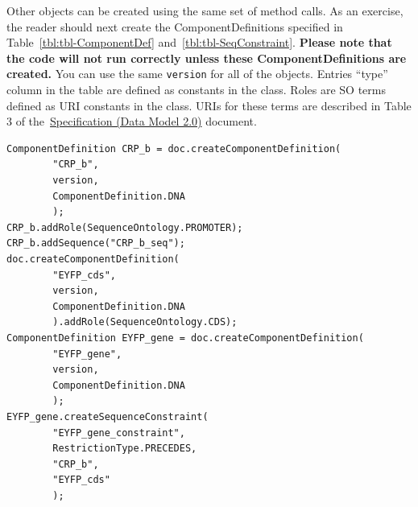 Other  objects can be created using the same set of method calls. As an exercise, the reader should next create the ComponentDefinitions specified in Table~\ref{tbl:tbl-ComponentDef} and~\ref{tbl:tbl-SeqConstraint}. \textbf{Please note that the code will not run correctly unless these ComponentDefinitions are created.} You can use the same \lstinline+version+ for all of the  objects. Entries ``type'' column in the table are defined as constants in the  class. Roles are SO terms defined as URI constants in the  class. URIs for these terms are described in Table 3 of the~\href{http://sbolstandard.org/downloads/specification-data-model-2-0/}{Specification  (Data Model 2.0)} document.

\vspace{\abovedisplayskip}
\begin{minipage}{0.95\textwidth}
\begin{lstlisting}
ComponentDefinition CRP_b = doc.createComponentDefinition(
        "CRP_b",
        version, 
        ComponentDefinition.DNA
        );
CRP_b.addRole(SequenceOntology.PROMOTER);
CRP_b.addSequence("CRP_b_seq");
doc.createComponentDefinition(
        "EYFP_cds", 
        version, 
        ComponentDefinition.DNA
        ).addRole(SequenceOntology.CDS);
ComponentDefinition EYFP_gene = doc.createComponentDefinition(
        "EYFP_gene", 
        version, 
        ComponentDefinition.DNA
        );
EYFP_gene.createSequenceConstraint(
        "EYFP_gene_constraint", 
        RestrictionType.PRECEDES, 
        "CRP_b", 
        "EYFP_cds"
        );
\end{lstlisting}
\end{minipage}

